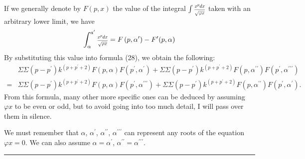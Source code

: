 \documentclass[oneside, 12 pt, leqno]{memoir}
\let\oldfrac\frac
\def\frac#1#2{\mathchoice{\text{\scalebox{.83}{${\oldfrac{#1}{#2}}$}}}{\text{\scalebox{.83}{${\displaystyle\oldfrac{#1}{#2}}$}}}{\genfrac{}{}{}{2}{#1}{#2}}{\genfrac{}{}{}{3}{#1}{#2}}}
\begin{document}
If we generally denote by \(F(p,x)\) the value of the integral \(\int \frac{x^p d x}{\sqrt{\varphi x}}\) taken with an arbitrary lower limit, we have
\[\int_\alpha^{a^{\prime}} \frac{x^p d x}{\sqrt{\rho x}}=F\left(p, \alpha^{\prime}\right)-F^{\prime}(p, \alpha)\]
By substituting this value into formula (28), we obtain the following:
\[\tag{29}\begin{aligned}
& \Sigma \Sigma\left(p-p^{\prime}\right) k^{\left(p+p^{\prime}+2\right)} F(p, \alpha) F\left(p^{\prime}, \alpha^{\prime}\right)+\Sigma \Sigma\left(p-p^{\prime}\right) k^{\left(p+p^{\prime}+2\right)} F\left(p, \alpha^{\prime \prime}\right) F\left(p^{\prime}, \alpha^{\prime \prime \prime}\right) \\
= & \Sigma \Sigma\left(p-p^{\prime}\right) k^{\left(p+p^{\prime}+2\right)} F(p, \alpha) F\left(p^{\prime}, \alpha^{\prime \prime \prime}\right)+\Sigma \Sigma\left(p-p^{\prime}\right) k^{\left(p+p^{\prime}+2\right)} F\left(p, \alpha^{\prime \prime}\right) F\left(p^{\prime}, \alpha^{\prime}\right).
\end{aligned}\]
From this formula, many other more specific ones can be deduced by assuming \(\varphi x\) to be even or odd, but to avoid going into too much detail, I will pass over them in silence.

We must remember that \(\alpha\), \(\alpha^{\prime}\), \(\alpha^{\prime \prime}\), \(\alpha^{\prime \prime \prime}\) can represent any roots of the equation \(\varphi x=0\). We can also assume \(\alpha=\alpha^{\prime}\), \(\alpha^{\prime \prime}=\alpha^{\prime \prime \prime}\).
\begin{center}\rule{2in}{0.1pt}\end{center}
\end{document}

